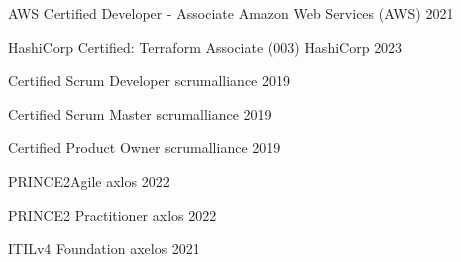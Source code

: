 

\begin{cvhonors}

  \cvhonor
    {AWS Certified Developer - Associate} %
    {Amazon Web Services (AWS)} %
    {} %
    {2021} %

  \cvhonor
    {HashiCorp Certified: Terraform Associate (003)} %
    {HashiCorp} %
    {} %
    {2023} %


\cvhonor
{Certified Scrum Developer} %
{scrumalliance} %
{} %
{2019} %


\cvhonor
{Certified Scrum Master} %
{scrumalliance} %
{} %
{2019} %

\cvhonor
{Certified Product Owner} %
{scrumalliance} %
{} %
{2019} %


\cvhonor
{PRINCE2Agile} %
{axlos} %
{} %
{2022} %


\cvhonor
{PRINCE2 Practitioner} %
{axlos} %
{} %
{2022} %



\cvhonor
{ITILv4 Foundation} %
{axelos} %
{} %
{2021} %


\end{cvhonors}
